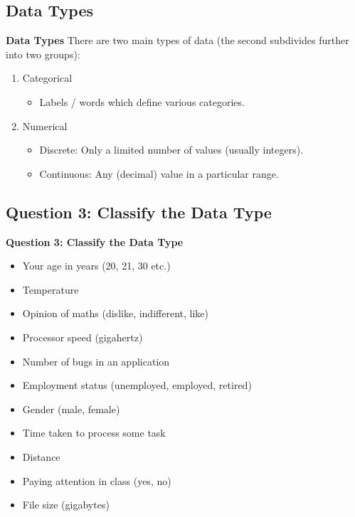 \documentclass[]{report}
\begin{document}
		\subsection{Data Types}
		{ \textbf{Data Types}}
		There are two main types of data (the second subdivides further into two groups):\\[0.5cm]
		\begin{enumerate}[1.]\itemsep0.8cm
			\item { Categorical}
			\begin{itemize}\itemsep0.3cm
				\item Labels / words which define various categories.
			\end{itemize}
			\item { Numerical}
			\begin{itemize}\itemsep0.3cm
				\item { Discrete}: Only a limited number of values (usually integers).
				\item { Continuous}: Any (decimal) value in a particular range.
			\end{itemize}
		\end{enumerate}
		
		
		
		
		\subsection{Question 3: Classify the Data Type}
		{ \textbf{Question 3: Classify the Data Type}}
		
		\begin{itemize}\itemsep0.2cm
			\item Your age in years (20, 21, 30 etc.)
			\item Temperature
			\item Opinion of maths (dislike, indifferent, like)
			\item Processor speed (gigahertz)
			\item Number of bugs in an application
			\item Employment status (unemployed, employed, retired)
			\item Gender (male, female)
			\item Time taken to process some task
			\item Distance
			\item Paying attention in class (yes, no)
			\item File size (gigabytes)
		\end{itemize}
		
\end{document}
